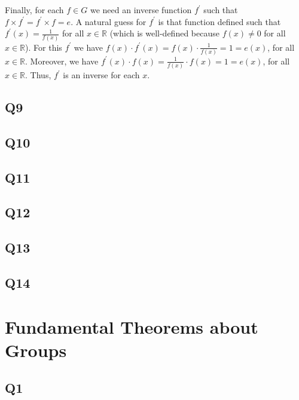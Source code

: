 \documentclass[12pt]{article}
\def\R{{\mathbb R}}        %
\numberwithin{theorem}{section}
\numberwithin{equation}{section}
\numberwithin{remark}{section}
\numberwithin{definition}{section}
\numberwithin{theorem}{section}
\numberwithin{lemma}{section}
\numberwithin{example}{section}
\begin{document}
Finally, for each $f\in G$ we need an inverse function $f^\prime$ such that $f\times f^\prime = f^\prime \times f = e$. A natural guess for $f^\prime$ is that function defined such that $f^\prime(x)=\frac{1}{f(x)}$ for all $x\in \R$ (which is well-defined because $f(x)\neq0$ for all $x\in \R$). For this $f^\prime$ we have $f(x)\cdot f^\prime(x)=f(x)\cdot\frac{1}{f(x)}=1=e(x)$, for all $x\in \R$. Moreover, we have $f^\prime(x)\cdot f(x)=\frac{1}{f(x)}\cdot f(x)=1=e(x)$, for all $x\in \R$. Thus, $f^\prime$ is an inverse for each $x$. 



\subsection{Q9}

\subsection{Q10}

\subsection{Q11}

\subsection{Q12}

\subsection{Q13}

\subsection{Q14}





\newpage

\section{Fundamental Theorems about Groups}

\subsection{Q1}
\end{document}
